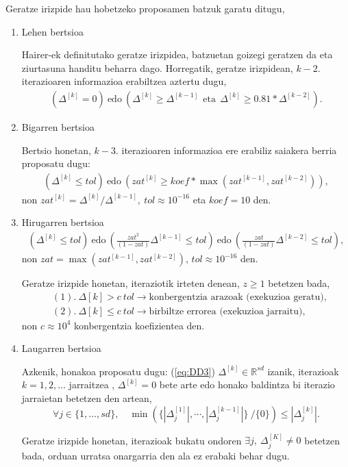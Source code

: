 Geratze irizpide hau hobetzeko proposamen batzuk garatu ditugu,
\begin{enumerate}
\item Lehen bertsioa

Hairer-ek definitutako geratze irizpidea, batzuetan goizegi geratzen da eta ziurtasuna handitu beharra dago.  Horregatik, geratze irizpidean, $k-2.$ iterazioaren informazioa erabiltzea aztertu dugu, 
\begin{align*}
(\Delta^{[k]} = 0) \ \text{edo} \ ( \Delta^{[k]}\geqslant \Delta^{[k-1]} \ \ \text{eta} \ \ \Delta^{[k]}\geqslant 0.81*\Delta^{[k-2]}).
\end{align*}

\item Bigarren bertsioa

Bertsio honetan, $k-3.$ iterazioaren informazioa ere erabiliz saiakera berria proposatu dugu:
\begin{align*}
\left(\Delta^{[k]} \leqslant tol \right) \ \text{edo} \ \left( zat^{[k]} \geqslant koef*\max(zat^{[k-1]},zat^{[k-2]}) \right),
\end{align*}
non $zat^{[k]}={\Delta^{[k]}}/{\Delta^{[k-1]}}, \ tol\approx10^{-16}$ eta $koef=10$ den.

\item Hirugarren bertsioa
\begin{align*}
\left(\Delta^{[k]} \leqslant tol\right) \ \text{edo} \ \left(\frac{zat^2}{(1-zat)} \Delta^{[k-1]} \leqslant tol\right) \ \text{edo} \ \left(\frac{zat}{(1-zat)}\Delta^{[k-2]} \leqslant tol\right),
\end{align*}
non $zat=\max(zat^{[k-1]},zat^{[k-2]})$, $tol\approx10^{-16}$ den.

Geratze irizpide honetan, iteraziotik irteten denean, $z\geqslant1$ betetzen bada,
\begin{align*}
&(1). \ \Delta {[k]} > c \ tol \rightarrow \text{konbergentzia arazoak (exekuzioa geratu)},\\
&(2). \ \Delta {[k]} \leqslant c \ tol \rightarrow \text{birbiltze errorea (exekuzioa jarraitu)},
\end{align*}   
non $c\approx 10^{4}$ konbergentzia koefizientea den. 

\item Laugarren bertsioa

Azkenik, honakoa proposatu dugu: (\ref{eq:DD3}) $\Delta ^{[k]} \in \mathbb{R}^{sd}$ izanik, iterazioak  $k=1,2,\ldots$ jarraitzea , $ \Delta^{[k]} =0$ bete arte edo honako baldintza bi iterazio jarraietan betetzen den artean,
\begin{equation*}
\forall j \in \{1,\ldots,s d\},  \quad
\min \left(\{|\Delta_j^{[1]}|,\cdots ,|\Delta_j^{[k-1]}|\} \ /\{0\} \right) \leqslant |\Delta_j^{[k]}|.
\end{equation*}

Geratze irizpide honetan, iterazioak bukatu ondoren $\exists j,  \ \Delta_{j}^{[K]} \neq 0$ betetzen bada, orduan urratsa onargarria den ala ez erabaki behar dugu. 


\end{enumerate}

